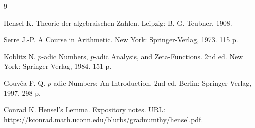 \documentclass{misisarticle}
\begin{document}
\begin{thebibliography}{9}

 Hensel K. Theorie der algebraischen Zahlen. Leipzig: B. G. Teubner, 1908.

 Serre J.-P. A Course in Arithmetic. New York: Springer-Verlag, 1973. 115 p.

 Koblitz N. $p$-adic Numbers, $p$-adic Analysis, and Zeta-Functions. 2nd ed. New York: Springer-Verlag, 1984. 151 p.

 Gouv\^ea F. Q. $p$-adic Numbers: An Introduction. 2nd ed. Berlin: Springer-Verlag, 1997. 298 p.

 Conrad K. Hensel's Lemma. Expository notes. URL: \url{https://kconrad.math.uconn.edu/blurbs/gradnumthy/hensel.pdf}.

\end{thebibliography}
\end{document}
